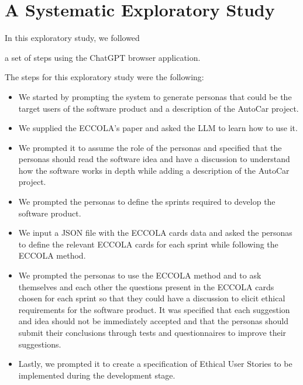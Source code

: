 \section{%
A  Systematic %
Exploratory Study}
In this exploratory study, we followed %

a set of steps using the ChatGPT browser application.

The steps for this exploratory study were the following:
\begin{itemize}
\item We started by prompting the system to generate personas that could be the target users of the software product and a description of the AutoCar project.

\item We supplied the %
ECCOLA's paper and asked the LLM to learn how to use it.

\item We prompted it to assume the role of the personas and specified that the personas should read the software idea and have a discussion to understand how the software works in depth while adding a description of the AutoCar project.

\item We prompted the personas to define the sprints required to develop the software product.

\item We input %
a JSON file with the ECCOLA cards data and asked the personas to define the relevant ECCOLA cards for each sprint while following the ECCOLA method. 

\item We prompted the personas to use the ECCOLA method and to ask themselves and each other the questions present in the ECCOLA cards chosen for each sprint so that they could have a discussion to elicit ethical requirements for the software product. It was specified that each suggestion and idea should not be immediately accepted and that the personas should submit their conclusions through tests and questionnaires to improve their suggestions.

\item Lastly, we prompted it to create a specification of Ethical User Stories to be implemented during the development stage.
\end{itemize}

